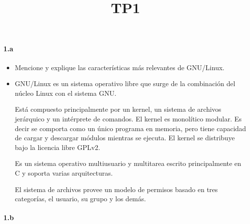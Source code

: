 \documentclass[10pt,a4paper]{paper}
\title{TP1}
\begin{document}
	
	\maketitle
	
	
	
	
	
	\paragraph{1.a}
	
	\begin{itemize}
		\item Mencione y explique las características más relevantes de GNU/Linux.
		
		
		\item GNU/Linux es un sistema operativo libre que surge de la combinación del
		núcleo Linux con el sistema GNU. 
		
		Está compuesto principalmente por un kernel, un sistema de archivos jerárquico
		y un intérprete de comandos. El kernel es monolítico modular. Es decir se
		comporta como un único programa en memoria, pero tiene capacidad de cargar y
		descargar módulos mientras se ejecuta. El kernel se distribuye bajo la licencia
		libre GPLv2.
		
		Es un sistema operativo multiusuario y multitarea escrito principalmente en C y
		soporta varias arquitecturas.
		
		El sistema de archivos provee un modelo de permisos basado en tres categorías,
		el usuario, su grupo y los demás.
		
	\end{itemize}
	
	
	
	\paragraph{1.b}
	
\end{document}

